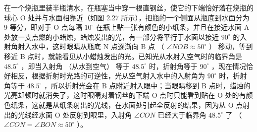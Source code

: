 在一个烧瓶里装半瓶清水，在瓶塞当中穿一根直钢丝，使它的下端恰好落在烧瓶的球心
O 处并与水面相靠近（如图 2.27 所示），把瓶的一个侧面从瓶底到水面分为 9
等分，即对于 O 点每隔 \(10^{\circ}\)
在瓶上贴一张有颜色的小纸条，并且在接近水面 A
处放一支点燃的小蜡烛，蜡烛发出的光，有一部分将平行于水面以接近
\(90^{\circ}\) 的入射角射入水中，这时眼睛从瓶底 N 点逐渐向 B 点 （
\(\angle NOB \approx 50^{\circ}\) ） 移动，等到移近 B
点时，就能看见从小蜡烛发出的光。已知光从水射入空气时的临界角是
\(48.5^{\circ}\) ，即当入射角 （从水到空气） 等于 \(48.5^{\circ}\)
时，折射角等于 \(90^{\circ}\)
，现在情况恰好相反，根据折射时光路的可逆性，光从空气射入水中的入射角为
\(90^{\circ}\) 时，折射角等于 \(48.5^{\circ}\) ，所以折射光会在 B
点附近射入眼中；当眼睛移到 B
点时，蜡烛的光亮却顿时就消失了，这时眼睛对着钢丝的下端 O
点时只能看到贴在 O
处的有颜色纸条，这就是从纸条射出的光线，在水面处引起全反射的结果，因为从
O 点射出的光线经水面 O 处反射到眼里，入射角 \(\angle CON\)
已经大于临界角 \(48.5^{\circ}\) 了 （
\(\angle CON = \angle BON \approx 50^{\circ}\) ）。

